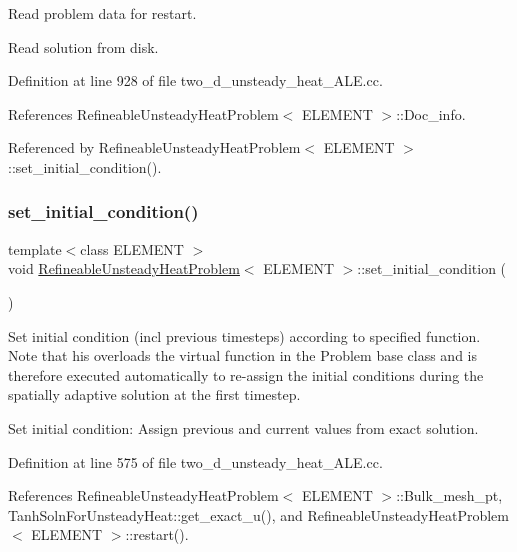 Read problem data for restart. 

Read solution from disk. 

Definition at line 928 of file two\+\_\+d\+\_\+unsteady\+\_\+heat\+\_\+\+A\+L\+E.\+cc.



References Refineable\+Unsteady\+Heat\+Problem$<$ E\+L\+E\+M\+E\+N\+T $>$\+::\+Doc\+\_\+info.



Referenced by Refineable\+Unsteady\+Heat\+Problem$<$ E\+L\+E\+M\+E\+N\+T $>$\+::set\+\_\+initial\+\_\+condition().

\mbox{\label{classRefineableUnsteadyHeatProblem_a30e2e1d62b059982f7014b74f4fe2be9}} 
\subsubsection{\texorpdfstring{set\+\_\+initial\+\_\+condition()}{set\_initial\_condition()}}
{\footnotesize\ttfamily template$<$class E\+L\+E\+M\+E\+NT $>$ \\
void \hyperlink{classRefineableUnsteadyHeatProblem}{Refineable\+Unsteady\+Heat\+Problem}$<$ E\+L\+E\+M\+E\+NT $>$\+::set\+\_\+initial\+\_\+condition (\begin{DoxyParamCaption}{ }\end{DoxyParamCaption})}



Set initial condition (incl previous timesteps) according to specified function. Note that his overloads the virtual function in the Problem base class and is therefore executed automatically to re-\/assign the initial conditions during the spatially adaptive solution at the first timestep. 

Set initial condition\+: Assign previous and current values from exact solution. 

Definition at line 575 of file two\+\_\+d\+\_\+unsteady\+\_\+heat\+\_\+\+A\+L\+E.\+cc.



References Refineable\+Unsteady\+Heat\+Problem$<$ E\+L\+E\+M\+E\+N\+T $>$\+::\+Bulk\+\_\+mesh\+\_\+pt, Tanh\+Soln\+For\+Unsteady\+Heat\+::get\+\_\+exact\+\_\+u(), and Refineable\+Unsteady\+Heat\+Problem$<$ E\+L\+E\+M\+E\+N\+T $>$\+::restart().




